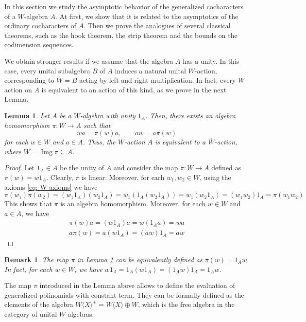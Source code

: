 \documentclass{article}
\newtheorem{lemma}[theorem]{Lemma}
\newtheorem{remark}[theorem]{Remark}
\newcommand{\WX}{W\langle X\rangle}
\DeclareMathOperator{\img}{Img}
\begin{document}
In this section we study the asymptotic behavior of the generalized cocharacters of a $W$-algebra $A$. At first, we show that it is related to the asymptotics of the ordinary cocharacters of $A$. Then we prove the analogues of several classical theorems, such as the hook theorem, the strip theorem and the bounds on the codimension sequences.

We obtain stronger results if we assume that the algebra $A$ has a unity. In this case, every unital subalgebra $B$ of $A$ induces a natural unital $W$-action, corresponding to $W=B$ acting by left and right multiplication. In fact, every $W$-action on $A$ is equivalent to an action of this kind, as we prove in the next Lemma.

 \begin{lemma}\label{lem: identity_good}
	Let $A$ be a $W$-algebra with unity $1_A$. Then, there exists an algebra homomorphism $\pi:W\rightarrow A$ such that
	\begin{equation}\label{eq: good_action}
		w a = \pi(w) a ,\qquad aw =a\pi(w)
	\end{equation}
	for each $w\in W$ and $a\in A$. Thus, the $W$-action $A$ is equivalent to a $\overline W$-action, where $\overline W=\img\pi\subseteq A$. 
	 \end{lemma}
 \begin{proof}
 		Let $1_A\in A$ be the unity of $A$ and consider the map $\pi:W\rightarrow A$ defined as $\pi(w)=w1_A$. Clearly, $\pi$ is linear. Moreover, for each $w_1,w_2\in W$, using the axioms \eqref{eq: W axioms} we have 
	    \[ \pi(w_1)\pi(w_2) = (w_1 1_A)(w_2 1_A) = w_1 (1_A (w_2 1_A)) = w_1(w_2 1_A)= (w_1w_2)1_A=\pi(w_1w_2)  \]
	    This shows that $\pi$ is an algebra homomorphism. Moreover, for each $w\in W$ and $a\in A$, we have \begin{gather*}
		        \pi(w)a=(w1_A)a=w(1_Aa)=wa  \\
		        a\pi(w) = a(w1_A)=(aw)1_A=aw
		\end{gather*}
	 \end{proof}

	\begin{remark}
	     The map $\pi$ in Lemma \ref{lem: identity_good} can be equivalently defined as $\pi(w)=1_A w$. In fact, for each $w\in W$, we have $w1_A=1_A(w1_A)=(1_Aw)1_A=1_Aw$.
	\end{remark}

    The map $\pi$ introduced in the Lemma above allows to define the evaluation of generalized polinomials with constant term. They can be formally defined as the elements of the algebra $\WX^+ = \WX\oplus W$, which is the free algebra in the category of unital $W$-algebras.
	
\end{document}
